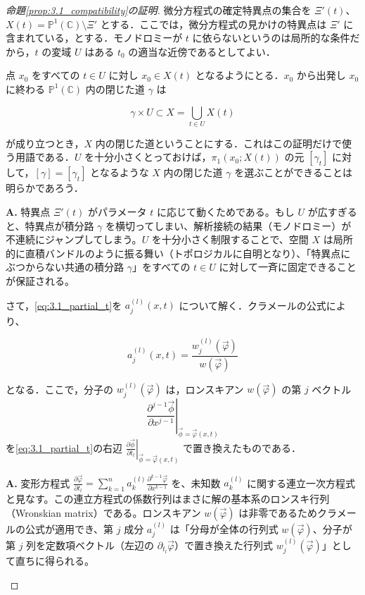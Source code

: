 \begin{proof}[命題\ref{prop:3.1_compatibility}の証明]
微分方程式の確定特異点の集合を $\Xi'(t)$、$X(t) = \mathbb{P}^1(\mathbb{C}) \setminus \Xi'$ とする．ここでは，微分方程式の見かけの特異点は $\Xi'$ に含まれている，とする．モノドロミーが $t$ に依らないというのは局所的な条件だから，$t$ の変域 $U$ はある $t_0$ の適当な近傍であるとしてよい．

点 $x_0$ をすべての $t \in U$ に対し $x_0 \in X(t)$ となるようにとる．$x_0$ から出発し $x_0$ に終わる $\mathbb{P}^1(\mathbb{C})$ 内の閉じた道 $\gamma$ は

\[
  \gamma \times U \subset X = \bigcup_{t \in U} X(t)
\]

が成り立つとき，$X$ 内の閉じた道ということにする．これはこの証明だけで使う用語である．$U$ を十分小さくとっておけば，$\pi_1(x_0; X(t))$ の元 $[\gamma_t]$ に対して，$[\gamma] = [\gamma_t]$ となるような $X$ 内の閉じた道 $\gamma$ を選ぶことができることは明らかであろう．

\begin{Q}
\textbf{A.} 特異点 $\Xi'(t)$ がパラメータ $t$ に応じて動くためである。もし $U$ が広すぎると、特異点が積分路 $\gamma$ を横切ってしまい、解析接続の結果（モノドロミー）が不連続にジャンプしてしまう。$U$ を十分小さく制限することで、空間 $X$ は局所的に直積バンドルのように振る舞い（トポロジカルに自明となり）、「特異点にぶつからない共通の積分路 $\gamma$」をすべての $t \in U$ に対して一斉に固定できることが保証される。
\end{Q}

さて，\eqref{eq:3.1_partial_t}を $a_j^{(l)}(x,t)$ について解く．クラメールの公式により、

\begin{equation}\label{eq:3.1_cramer_wronskian}
  a_j^{(l)}(x,t) = \frac{w_j^{(l)}(\vec{\varphi})}{w(\vec{\varphi})}
\end{equation}

となる．ここで，分子の $w_j^{(l)}(\vec{\varphi})$ は，ロンスキアン $w(\vec{\varphi})$ の第 $j$ ベクトル
\[
  \left. \frac{\partial^{j-1}\vec{\phi}}{\partial x^{j-1}} \right|_{\vec{\phi}=\vec{\varphi}(x,t)}
\]
を\eqref{eq:3.1_partial_t}の右辺 $\left. \frac{\partial \vec{\phi}}{\partial t_l} \right|_{\vec{\phi}=\vec{\varphi}(x,t)}$ で置き換えたものである．

\begin{Q}
\textbf{A.} 変形方程式 $\frac{\partial \vec{\varphi}}{\partial t_l} = \sum_{k=1}^n a_k^{(l)} \frac{\partial^{k-1}\vec{\varphi}}{\partial x^{k-1}}$ を、未知数 $a_k^{(l)}$ に関する連立一次方程式と見なす。この連立方程式の係数行列はまさに解の基本系のロンスキ行列（Wronskian matrix）である。ロンスキアン $w(\vec{\varphi})$ は非零であるためクラメールの公式が適用でき、第 $j$ 成分 $a_j^{(l)}$ は「分母が全体の行列式 $w(\vec{\varphi})$、分子が第 $j$ 列を定数項ベクトル（左辺の $\partial_{t_l} \vec{\varphi}$）で置き換えた行列式 $w_j^{(l)}(\vec{\varphi})$」として直ちに得られる。
\end{Q}


\end{proof}
